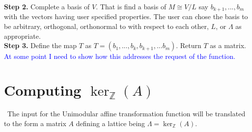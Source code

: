 \documentclass{article}
\newcommand{\nl}{\bigskip \\ } %
\newcommand{\Z}[0]{\mathbb{Z}}		%
\newcommand{\R}[0]{\mathbb{R}}		%
\theoremstyle{definition}
\theoremstyle{remark}
\begin{document}
\textbf{Step 2.} Complete a basis of $V$. That is find a basis of $M\cong V/L$ say $b_{k+1},..., b_{m}$ with the vectors having user specified properties. The user can chose the basis to be arbitrary, orthogonal, orthonormal to with respect to each other, $L$, or $\Lambda$ as appropriate. %
\nl 
\textbf{Step 3.} Define the map $T$ as $T = (b_1,...,b_k,b_{k+1},...b_m)$. Return $ T$ as a matrix. \textcolor{blue}{At some point I need to show how this addresses the request of the function.}  \nl 




\section{Computing $\ker_\Z(A)$}\
The input for the Unimodular affine transformation function will be translated to the form a matrix $A$ defining a lattice being $\Lambda= \ker_\Z(A)$. 
\end{document}

